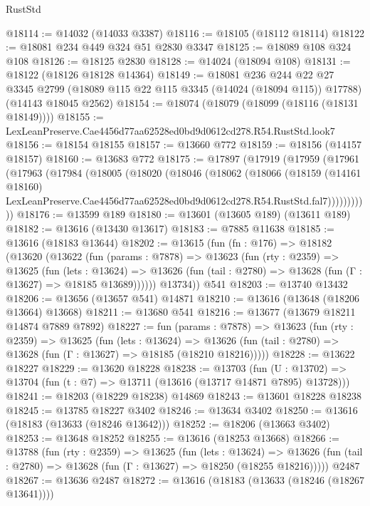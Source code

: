 \begin{lexlean}{RustStd}
\begin{coremodule}
@18114 := @14032 (@14033 @3387)
@18116 := @18105 (@18112 @18114)
@18122 := @18081 @234 @449 @324 @51 @2830 @3347
@18125 := @18089 @108 @324 @108
@18126 := @18125 @2830
@18128 := @14024 (@18094 @108)
@18131 := @18122 (@18126 @18128 @14364)
@18149 := @18081
    @236
    @244
    @22
    @27
    @3345
    @2799
    (@18089 @115 @22 @115 @3345 (@14024 (@18094 @115)) @17788)
    (@14143 @18045 @2562)
@18154 := @18074 (@18079 (@18099 (@18116 (@18131 @18149))))
@18155 := LexLeanPreserve.Cae4456d77aa62528ed0bd9d0612cd278.R54.RustStd.look7
@18156 := @18154 @18155
@18157 := @13660 @772
@18159 := @18156 (@14157 @18157)
@18160 := @13683 @772
@18175 := @17897
    (@17919
      (@17959
        (@17961
          (@17963
            (@17984
              (@18005
                (@18020
                  (@18046
                    (@18062
                      (@18066
                        (@18159
                          (@14161 @18160)
                          LexLeanPreserve.Cae4456d77aa62528ed0bd9d0612cd278.R54.RustStd.fal7)))))))))))
@18176 := @13599 @189
@18180 := @13601 (@13605 @189) (@13611 @189)
@18182 := @13616 (@13430 @13617)
@18183 := @7885 @11638
@18185 := @13616 (@18183 @13644)
@18202 := @13615
    (fun (fn : @176) =>
    @18182
      (@13620
        (@13622
          (fun (params : @7878) =>
          @13623
            (fun (rty : @2359) =>
            @13625
              (fun (lets : @13624) =>
              @13626 (fun (tail : @2780) => @13628 (fun (Γ : @13627) => @18185 @13689))))))
        @13734))
    @541
@18203 := @13740 @13432
@18206 := @13656 (@13657 @541) @14871
@18210 := @13616 (@13648 (@18206 @13664) @13668)
@18211 := @13680 @541
@18216 := @13677 (@13679 @18211 @14874 @7889 @7892)
@18227 := fun (params : @7878) =>
  @13623
    (fun (rty : @2359) =>
    @13625
      (fun (lets : @13624) =>
      @13626 (fun (tail : @2780) => @13628 (fun (Γ : @13627) => @18185 (@18210 @18216)))))
@18228 := @13622 @18227
@18229 := @13620 @18228
@18238 := @13703
    (fun (U : @13702) => @13704 (fun (t : @7) => @13711 (@13616 (@13717 @14871 @7895) @13728)))
@18241 := @18203 (@18229 @18238) @14869
@18243 := @13601 @18228 @18238
@18245 := @13785 @18227 @3402
@18246 := @13634 @3402
@18250 := @13616 (@18183 (@13633 (@18246 @13642)))
@18252 := @18206 (@13663 @3402)
@18253 := @13648 @18252
@18255 := @13616 (@18253 @13668)
@18266 := @13788
    (fun (rty : @2359) =>
    @13625
      (fun (lets : @13624) =>
      @13626 (fun (tail : @2780) => @13628 (fun (Γ : @13627) => @18250 (@18255 @18216)))))
    @2487
@18267 := @13636 @2487
@18272 := @13616 (@18183 (@13633 (@18246 (@18267 @13641))))

\end{coremodule}
\end{lexlean}
